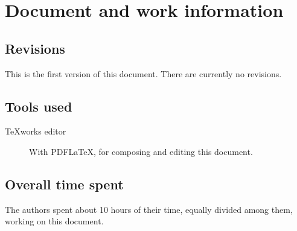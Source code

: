 \chapter{Document and work information}

\section{Revisions}
This is the first version of this document. There are currently no revisions.

\section{Tools used}
\begin{description}
\item[TeXworks editor] With PDF\LaTeX{}, for composing and editing this document.
\end{description}

\section{Overall time spent}
The authors spent about 10 hours of their time, equally divided among them, working on this document.
